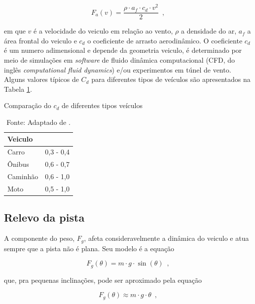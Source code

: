 \begin{equation}
	\label{eq:Fa}
	F_a(v) = \frac{\rho \cdot a_f \cdot c_d \cdot v^2}{2}
	\enspace,
\end{equation}

em que $v$ é a velocidade do veiculo em relação ao vento, $\rho$ a densidade do ar, $a_{f}$ a área frontal do
veiculo e $c_{d}$ o coeficiente de arrasto aerodinâmico.
O coeficiente $c_{d}$ é um numero adimensional e depende da geometria veiculo, é determinado por meio de simulações em \textit{software} de fluido
dinâmica
computacional (CFD, do inglês \textit{computational fluid dynamics}) e/ou experimentos em túnel de vento\cite{book:guzzella2012vehicle}. Alguns
valores típicos de $C_{d}$ para diferentes tipos de
veículos são apresentados na Tabela \ref{tab:ComparacaoCD}.

\begin{table}[h]
	\centering
	\caption{Comparação do $c_{d}$ de diferentes tipos veículos}
	\begin{tabular}{ll}
		\toprule
		\textbf{Veiculo} & \boldsymbol{$c_{d}$} \\
		\hline
		Carro            & 0,3 - 0,4            \\
		Ônibus           & 0,6 - 0,7            \\
		Caminhão         & 0,6 - 1,0            \\
		Moto             & 0,5 - 1,0            \\
		\bottomrule
	\end{tabular}
	\caption*{\footnotesize Fonte: Adaptado de \citeauthor{book:GroundVehicleDynamics}.}
	\label{tab:ComparacaoCD}
\end{table}

\subsection{Relevo da pista}

A componente do peso, $F_{g}$, afeta consideravelmente a dinâmica do veiculo e atua sempre que a pista não é plana. Seu modelo é a equação

\[
	F_{g}(\theta) = m \cdot g \cdot \sin(\theta)
	\enspace,
\]

que, pra pequenas inclinações, pode ser aproximado pela equação

\begin{equation}
	\label{eq:Fg}
	F_{g}(\theta) \approx  m \cdot g \cdot \theta
	\enspace,
\end{equation}

